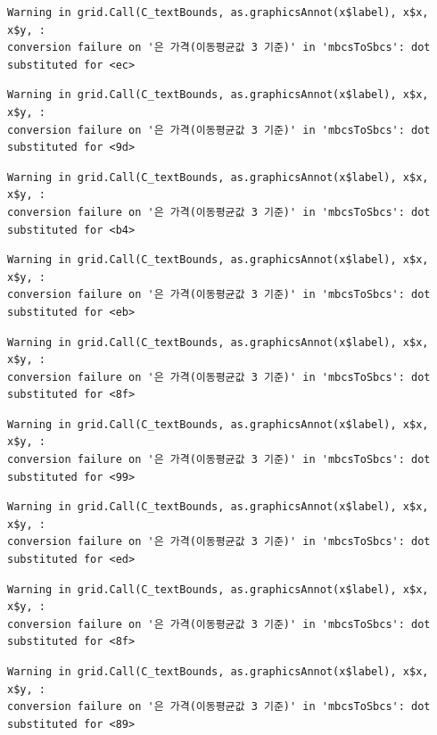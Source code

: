 \documentclass[
  letterpaper,
  DIV=11,
  numbers=noendperiod]{scrreprt}
\begin{document}
\begin{verbatim}
Warning in grid.Call(C_textBounds, as.graphicsAnnot(x$label), x$x, x$y, :
conversion failure on '은 가격(이동평균값 3 기준)' in 'mbcsToSbcs': dot
substituted for <ec>
\end{verbatim}

\begin{verbatim}
Warning in grid.Call(C_textBounds, as.graphicsAnnot(x$label), x$x, x$y, :
conversion failure on '은 가격(이동평균값 3 기준)' in 'mbcsToSbcs': dot
substituted for <9d>
\end{verbatim}

\begin{verbatim}
Warning in grid.Call(C_textBounds, as.graphicsAnnot(x$label), x$x, x$y, :
conversion failure on '은 가격(이동평균값 3 기준)' in 'mbcsToSbcs': dot
substituted for <b4>
\end{verbatim}

\begin{verbatim}
Warning in grid.Call(C_textBounds, as.graphicsAnnot(x$label), x$x, x$y, :
conversion failure on '은 가격(이동평균값 3 기준)' in 'mbcsToSbcs': dot
substituted for <eb>
\end{verbatim}

\begin{verbatim}
Warning in grid.Call(C_textBounds, as.graphicsAnnot(x$label), x$x, x$y, :
conversion failure on '은 가격(이동평균값 3 기준)' in 'mbcsToSbcs': dot
substituted for <8f>
\end{verbatim}

\begin{verbatim}
Warning in grid.Call(C_textBounds, as.graphicsAnnot(x$label), x$x, x$y, :
conversion failure on '은 가격(이동평균값 3 기준)' in 'mbcsToSbcs': dot
substituted for <99>
\end{verbatim}

\begin{verbatim}
Warning in grid.Call(C_textBounds, as.graphicsAnnot(x$label), x$x, x$y, :
conversion failure on '은 가격(이동평균값 3 기준)' in 'mbcsToSbcs': dot
substituted for <ed>
\end{verbatim}

\begin{verbatim}
Warning in grid.Call(C_textBounds, as.graphicsAnnot(x$label), x$x, x$y, :
conversion failure on '은 가격(이동평균값 3 기준)' in 'mbcsToSbcs': dot
substituted for <8f>
\end{verbatim}

\begin{verbatim}
Warning in grid.Call(C_textBounds, as.graphicsAnnot(x$label), x$x, x$y, :
conversion failure on '은 가격(이동평균값 3 기준)' in 'mbcsToSbcs': dot
substituted for <89>
\end{verbatim}
\end{document}
